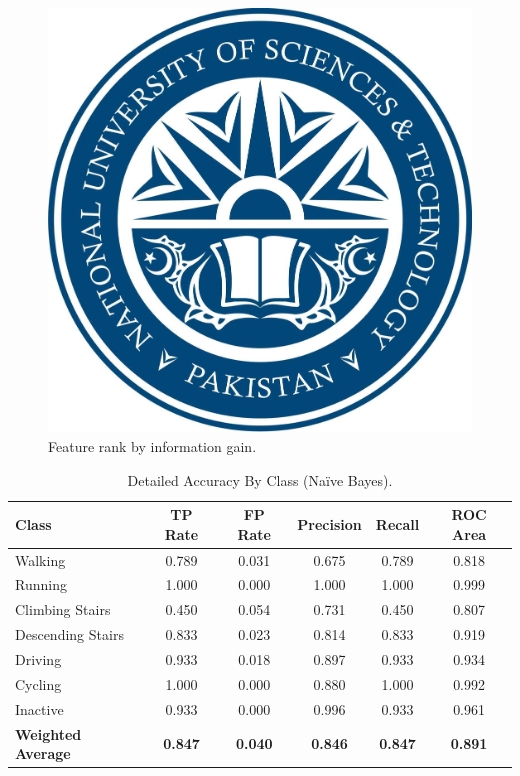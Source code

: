 \documentclass[12pt,a4paper,oneside]{book}
\begin{document}
\begin{figure}[htp]
\centering
\includegraphics[width=0.9\columnwidth]{nust}%
\caption{Feature rank by information gain.}
\label{fig:Feature_Rank}
\end{figure}

\begin{table}[!tbh]
\caption{Detailed Accuracy By Class (Na\"ive Bayes).}
\label{tab:Perf_Metrics_Naive_Bayes}
\centering
\begin{tabular}[width=\columnwidth]{|p{1.3in}|c|c|c|c|c|}
\hline
Class               & TP Rate   & FP Rate   & Precision & Recall    & ROC Area \\
\hline
Walking 	        	& 0.789	    & 0.031	    & 0.675	    & 0.789	    & 0.818 \\
Running	            & 1.000	    & 0.000	    & 1.000	    & 1.000	    & 0.999 \\
Climbing Stairs	    & 0.450	    & 0.054	    & 0.731	    & 0.450	    & 0.807 \\
Descending Stairs		& 0.833	    & 0.023	    & 0.814	    & 0.833	    & 0.919 \\
Driving	            & 0.933	    & 0.018	    & 0.897	    & 0.933	    & 0.934 \\
Cycling	            & 1.000	    & 0.000	    & 0.880	    & 1.000	    & 0.992 \\
Inactive            & 0.933	    & 0.000	    & 0.996	    & 0.933	    & 0.961 \\
\hline
\textbf{Weighted Average}	& \textbf{0.847}	    & \textbf{0.040}	    & \textbf{0.846}	    & \textbf{0.847}	    & \textbf{0.891} \\
\hline
\end{tabular}
\end{table}
\end{document}
